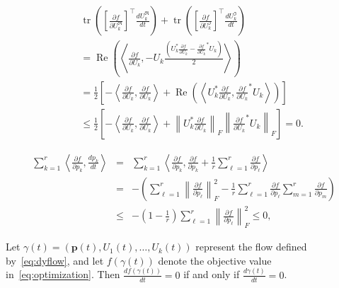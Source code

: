 \documentclass[10pt,a4paper]{amsart}
\begin{document}
    \begin{eqnarray}\label{eq:normU}  
    &&\operatorname{tr}\left(\left[\frac{\partial f}{\partial U_k^\mathfrak{R}
    }\right]^\top \frac{d U_k^\mathfrak{R}
    }{dt} \right) 
    +\operatorname{tr}\left(\left[\frac{\partial f}{\partial U_k^\mathfrak{I}
    }\right]^\top \frac{d U_k^\mathfrak{I}
    }{dt} \right)\nonumber\\
    &&= \operatorname{Re}\left(\left\langle \frac{\partial f}{\partial U_k}, -
     U_k \frac{\left( U_k^* 
    \frac{\partial f}{\partial U_k} -  
    {\frac{\partial f}{\partial U_k}}^* U_k 
    \right)}{2} \right\rangle\right ) \nonumber\\  
    &&=  \frac{1}{2}
    \left[
    -  \left\langle \frac{\partial f}{\partial U_k}, \frac{\partial f}{\partial U_k} \right\rangle
    + 
    \operatorname{Re} \left(
    \left\langle U_k^* \frac{\partial f}{\partial U_k}, {\frac{\partial f}{\partial U_k}}^* U_k  \right\rangle\right)  
    \right] \nonumber\\  
    &&\leq  
    \frac{1}{2}
    \left[
    -  \left\langle \frac{\partial f}{\partial U_k}, \frac{\partial f}{\partial U_k} \right\rangle
    + \left\| U_k^* \frac{\partial f}{\partial U_k} \right\|_F 
    \left
    \| {\frac{\partial f}{\partial U_k}}^* U_k \right\|_F  
    \right] = 0.  
    \end{eqnarray}  

    \begin{eqnarray}\label{eq:5}  
    \sum_{k=1}^r \left\langle \frac{\partial f}{\partial p_k}, \frac{d p_k}{dt} \right\rangle  
      &=&  
      \sum_{k=1}^r \left\langle \frac{\partial f}{\partial p_k},  
    \frac{\partial f}{\partial p_k} + \frac{1}{r} \sum_{\ell=1}^r \frac{\partial f}{\partial p_\ell}  
      \right\rangle \nonumber\\  
      &=& -\left(\sum_{\ell=1}^r 
      \left\|\frac{\partial f}{\partial p_\ell}\right\|_F^2  - \frac{1}{r} \sum_{\ell=1}^r \frac{\partial f}{\partial p_\ell} \sum_{m=1}^r \frac{\partial f}{\partial p_m} \right) \nonumber\\  
      &\leq& -\left(1 - \frac{1}{r}\right)\sum_{\ell=1}^r \left\|\frac{\partial f}{\partial p_\ell}\right\|_F^2 
      \leq 0,  
    \end{eqnarray}  

    \begin{corollary}
    Let $\gamma(t) = (\mathbf{p}(t), U_1(t), \ldots, U_k(t))$ represent the flow defined by~\eqref{eq:dyflow}, and let $f(\gamma(t))$ denote the objective value in~\eqref{eq:optimization}. Then $\frac{df(\gamma(t))}{dt} = 0$ if and only if $\frac{d\gamma(t)}{dt} = 0$.
    \end{corollary}
\end{document}
